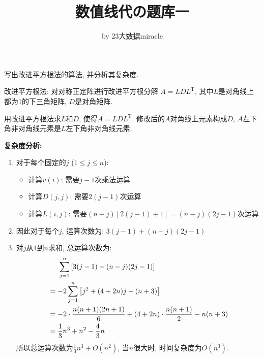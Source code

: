 \documentclass[12pt, answers]{exam}     %
\title{数值线代の题库一}
\author{by 23大数据miracle}
\date{}
\newcommand{\T}{\mathrm{T}}
\begin{document}
\maketitle

\begin{questions}
\question{}
写出改进平方根法的算法, 并分析其复杂度. 

\begin{solution}
改进平方根法: 对对称正定阵进行改进平方根分解 $A = LDL^{\T}$, 其中$L$是对角线上都为1的下三角矩阵, $D$是对角矩阵.

\begin{algorithm}[H]
\caption{用改进平方根法求$L$和$D$, 使得$A = LDL^{\T}$. 修改后的$A$对角线上元素构成$D$, $A$左下角非对角线元素是$L$左下角非对角线元素.}
\end{algorithm}

\textbf{复杂度分析:}
\begin{enumerate}
    \item 对于每个固定的$j$ ($1 \leq j \leq n$):
        \begin{itemize}
            \item 计算$v(i)$: 需要$j-1$次乘法运算
            \item 计算$D(j,j)$: 需要$2(j-1)$次运算
            \item 计算$L(i,j)$: 需要$(n-j)[2(j-1)+1] = (n-j)(2j-1)$次运算
        \end{itemize}
    \item 因此对于每个$j$, 运算次数为: $3(j-1) + (n-j)(2j-1)$
    \item 对$j$从$1$到$n$求和, 总运算次数为: 
        \begin{align*}
            &\hspace{5mm} \sum_{j=1}^n \left[3(j-1) + (n-j)(2j-1)\right] \\
            &= -2\sum_{j=1}^n \left[j^2 + (4 + 2n)j - (n + 3)\right] \\
            &= -2 \cdot \frac{n(n+1)(2n+1)}{6} + (4+2n) \cdot \frac{n(n+1)}{2} - n(n+3) \\
            &= \frac{1}{3}n^3 + n^2 - \frac{4}{3}n
        \end{align*}
        所以总运算次数为$\frac{1}{3}n^3 + O(n^2)$, 当$n$很大时, 时间复杂度为$O(n^3)$. 
\end{enumerate}
\end{solution}


\end{questions}
\end{document}
